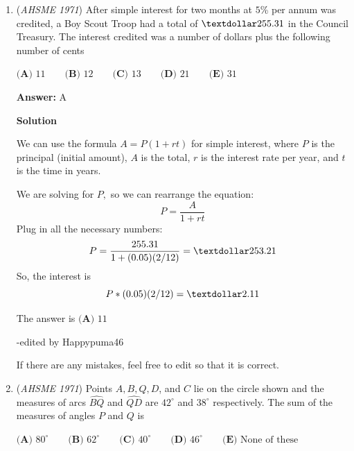 \begin{enumerate}
 $\textbf{(A) }-2\qquad \textbf{(B) }2\qquad \textbf{(C) }-8\qquad \textbf{(D) }6\qquad  \textbf{(E) }-6$

 \textbf{Answer: }E



\textbf{Solution}

Since $(x,-4)$ is on the line $(0,8)$ and $(-4,0)$, the slope between the latter two is the same as the slope between the former two, so $\frac{-4-8}{x-0}=\frac{8-0}{0-(-4)}$. Solving for $x$, we get $x=-6$, so the answer is $\boxed{\textbf{(E) }-6}$.

 


	\item (\textit{AHSME 1971}) After simple interest for two months at $5$\% per annum was credited, a Boy Scout Troop had a total 
of $\textdollar 255.31$ in the Council Treasury. The interest credited was a number of dollars plus the following number of cents


 $\textbf{(A) }11\qquad \textbf{(B) }12\qquad \textbf{(C) }13\qquad \textbf{(D) }21\qquad  \textbf{(E) }31$

 \textbf{Answer: }A



\textbf{Solution}

We can use the formula $A = P(1+rt)$ for simple interest, where $P$ is the principal (initial amount), $A$ is the total, $r$ is the interest rate per year, and $t$ is the time in years.

 We are solving for $P,$ so we can rearrange the equation:
 \[P = \frac{A}{1+rt}\]Plug in all the necessary numbers:
 \[P = \frac{255.31}{1 + (0.05)(2/12)} = \textdollar 253.21\]So, the interest is 
 \[P*(0.05)(2/12) = \textdollar 2.11\]

 The answer is $\boxed{\textbf{(A) }11}$

 -edited by Happypuma46

 If there are any mistakes, feel free to edit so that it is correct.

 


	\item (\textit{AHSME 1971}) Points $A,B,Q,D$, and $C$ lie on the circle shown and the measures of arcs $\widehat{BQ}$ and $\widehat{QD}$ 
are $42^\circ$ and $38^\circ$ respectively. The sum of the measures of angles $P$ and $Q$ is


 $\textbf{(A) }80^\circ\qquad \textbf{(B) }62^\circ\qquad \textbf{(C) }40^\circ\qquad \textbf{(D) }46^\circ\qquad  \textbf{(E) }\text{None of these}$


\end{enumerate}
